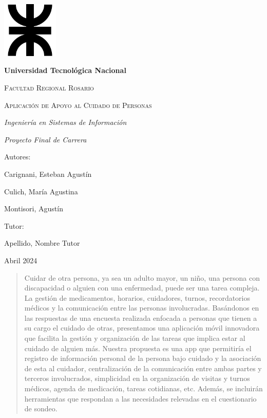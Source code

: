 \documentclass[a4paper,12pt]{article}
\begin{document}
    \begin{titlepage}
        \centering
        \includegraphics[width=0.2\textwidth]{Imagenes/LogoUTN.png}\par
        \vfill
        {\bfseries\LARGE Universidad Tecnológica Nacional \par}
        \vfill
        {\scshape\Large Facultad Regional Rosario \par}
        \vfill
        {\scshape\Huge Aplicación de Apoyo al Cuidado de Personas \par}
        \vfill
        {\itshape\Large Ingeniería en Sistemas de Información \par}
        {\itshape\Large Proyecto Final de Carrera \par}
        \vfill
        {\Large Autores: \par}
        {\Large Carignani, Esteban Agustín \par}
        {\Large Culich, María Agustina \par}
        {\Large Montisori, Agustín \par}
        \vfill
        {\Large Tutor: \par}
        {\Large Apellido, Nombre Tutor \par}
        \vfill
        {\Large Abril 2024 \par}
    \end{titlepage}

    \begin{abstract}
        Cuidar de otra persona, ya sea un adulto mayor, 
        un niño, una persona con discapacidad o alguien 
        con una enfermedad, puede ser una tarea compleja. 
        La gestión de medicamentos, horarios, cuidadores, 
        turnos, recordatorios médicos y la comunicación 
        entre las personas involucradas.
        Basándonos en las respuestas de una encuesta realizada 
        enfocada a personas que tienen a su cargo el 
        cuidado de otras, presentamos una aplicación móvil 
        innovadora que facilita la gestión y organización de 
        las tareas que implica estar al cuidado de alguien más. 
        Nuestra propuesta es una app que permitiría el registro 
        de información personal de la persona bajo cuidado y 
        la asociación de esta al cuidador, centralización de 
        la comunicación entre ambas partes y terceros 
        involucrados, simplicidad en la organización de visitas 
        y turnos médicos, agenda de medicación, tareas 
        cotidianas, etc. Además, se incluirán herramientas que 
        respondan a las necesidades relevadas en el 
        cuestionario de sondeo.
    \end{abstract}

    
\end{document}
